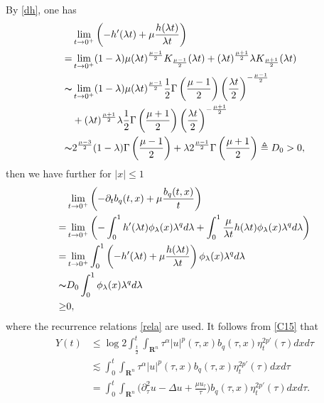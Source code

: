 \documentclass[review]{elsarticle}
\newcommand{\R}{\mathbf{R}}
\begin{document}
By \eqref{dh}, one has
\begin{equation}\label{dh1}
\begin{aligned}
&\lim_{t\rightarrow 0^+}\left(-h'(\lambda t)+\mu\frac{h(\lambda t)}{\lambda t}\right)\\
=&\lim_{t\rightarrow 0^+}(1-\lambda)\mu(\lambda t)^{\frac{\mu-1}{2}}K_{\frac{\mu-1}{2}}(\lambda t)+(\lambda t)^{\frac{\mu+1}{2}}\lambda K_{\frac{\mu+1}{2}}(\lambda t)\\
\thicksim&\lim_{t\rightarrow 0^+}
(1-\lambda)\mu(\lambda t)^{\frac{\mu-1}{2}}\frac12\Gamma\left(\frac{\mu-1}{2}\right)
\left(\frac {\lambda t}{2}\right)^{-\frac{\mu-1}{2}}\\
&+(\lambda t)^{\frac{\mu+1}{2}}\lambda\frac12\Gamma\left(\frac{\mu+1}{2}\right)
\left(\frac {\lambda t}{2}\right)^{-\frac{\mu+1}{2}}\\
\thicksim & 2^{\frac{\mu-3}{2}}(1-\lambda)\Gamma\left(\frac{\mu-1}{2}\right)
+\lambda 2^{\frac{\mu-1}{2}}\Gamma\left(\frac{\mu+1}{2}\right)\triangleq D_0>0,\\
\end{aligned}
\end{equation}
then we have further for $|x|\le 1$
\begin{equation}\label{dh2}
\begin{aligned}
&\lim_{t\rightarrow 0^+}\left(-\partial_tb_q(t,x)+\mu\frac{b_q(t,x)}{t}\right)\\
=&\lim_{t\rightarrow 0^+}\left(-\int_{0}^{1}h'(\lambda t)\phi_\lambda(x)\lambda^{q}d\lambda+\int_{0}^{1}\frac{\mu}{\lambda t}h(\lambda t)\phi_\lambda(x)\lambda^{q}d\lambda\right)\\
=&\lim_{t\rightarrow 0^+}\int_{0}^{1}\left(-h'(\lambda t)+\mu\frac{h(\lambda  t)}{\lambda t}\right)\phi_\lambda(x)\lambda^{q}d\lambda\\
\thicksim &  D_0\int_{0}^{1}\phi_\lambda(x)\lambda^{q}d\lambda\\
\ge &0,
\end{aligned}
\end{equation}
where the recurrence relations \eqref{rela} are used. It follows from \eqref{C15} that
\begin{equation}\label{C5}
\begin{aligned}
Y(t)&\leq \log2\int_{\frac{t}{2}}^{t}\int_{\R^n}\tau^{\alpha}|u|^p(\tau,x)b_q(\tau,x)\eta^{2p'}_t(\tau)dxd\tau\\
&\lesssim \int_{0}^{t}\int_{\R^n}\tau^{\alpha}|u|^p(\tau,x)b_q(\tau,x)\eta^{2p'}_t(\tau)dxd\tau\\
&=\int_0^t\int_{\R^n}\bigg(\partial_\tau^2u-\Delta u +\frac{\mu u_\tau}{\tau}\bigg)b_q(\tau,x)\eta^{2p'}_t(\tau)dxd\tau.
\end{aligned}
\end{equation}
\end{document}

